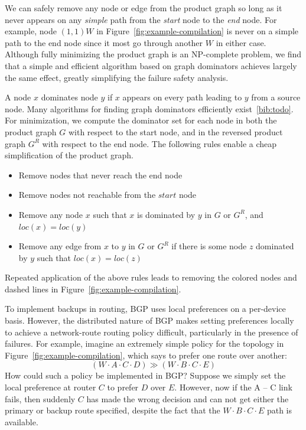 We can safely remove any node or edge from the product graph so long as it never appears on any \emph{simple} path from the \textit{start} node to the \emph{end} node. For example, node $(1,1) W$ in Figure~\ref{fig:example-compilation} is never on a simple path to the end node since it most go through another $W$ in either case.
%
Although fully minimizing the product graph is an NP-complete problem, we find that a simple and efficient algorithm based on graph dominators achieves largely the same effect, greatly simplifying the failure safety analysis. 

A node $x$ dominates node $y$ if $x$ appears on every path leading to $y$ from a source node. Many algorithms for finding graph dominators efficiently exist~\ref{bib:todo}. For minimization, we compute the dominator set for each node in both the product graph $G$ with respect to the start node, and in the reversed product graph $G^R$ with respect to the end node. The following rules enable a cheap simplification of the product graph.
%
\begin{itemize}
  \item Remove nodes that never reach the end node
  \item Remove nodes not reachable from the $start$ node
  \item Remove any node $x$ such that $x$ is dominated by $y$ in $G$ or $G^R$, and $loc(x) = loc(y)$
  \item Remove any edge from $x$ to $y$ in $G$ or $G^R$ if there is some node $z$ dominated by $y$ such that $loc(x) = loc(z)$
\end{itemize}
%
Repeated application of the above rules leads to removing the colored nodes and dashed lines in Figure~\ref{fig:example-compilation}. 


To implement backups in routing, BGP uses local preferences on a per-device basis. However, the distributed nature of BGP makes setting preferences locally to achieve a network-route routing policy difficult, particularly in the presence of failures. For example, imagine an extremely simple policy for the topology in Figure~\ref{fig:example-compilation}, which says to prefer one route over another:
%
$$(W \cdot A \cdot C \cdot D) \gg (W \cdot B \cdot C \cdot E)$$
%
How could such a policy be implemented in BGP? Suppose we simply set the local preference at router $C$ to prefer $D$ over $E$. However, now if the A -- C link fails, then suddenly $C$ has made the wrong decision and can not get either the primary or backup route specified, despite the fact that the $W \cdot B \cdot C \cdot E$ path is available.

